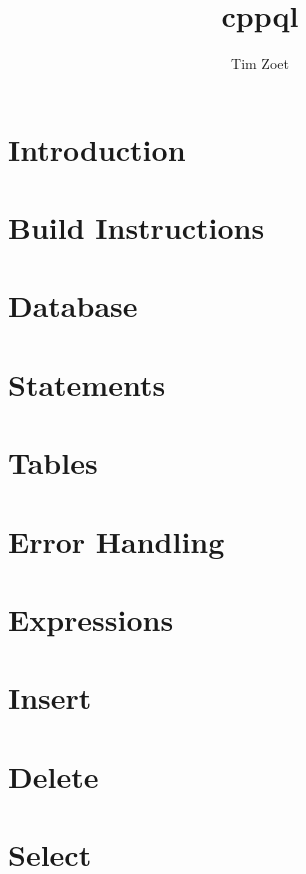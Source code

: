 \documentclass[twoside,a4paper,smallborder=true]{refart}
\title{cppql}
\author{Tim Zoet}
\date{}
\begin{document}
\maketitle

\tableofcontents
\newpage

\section{Introduction}
\label{section:introduction}

\newpage

\section{Build Instructions}
\label{section:build}

\newpage

\section{Database}
\label{section:database}

\newpage

\section{Statements}
\label{section:statements}

\newpage

\section{Tables}
\label{section:tables}

\newpage

\section{Error Handling}
\label{section:errors}

\newpage

\section{Expressions}
\label{section:expressions}

\newpage

\section{Insert}
\label{section:insert}

\newpage

\section{Delete}
\label{section:delete}

\newpage

\section{Select}
\label{section:select}

\newpage

\printglossaries
\newpage

 
 
\printindex
\end{document}
